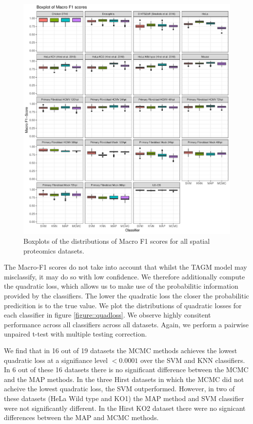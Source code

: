 \documentclass[12pt,english]{article}\usepackage[]{graphicx}\usepackage[]{color}
\makeatletter
\def\maxwidth{ %
  \ifdim\Gin@nat@width>\linewidth
    \linewidth
  \else
    \Gin@nat@width
  \fi
}
\newenvironment{knitrout}{}{} %
\makeatother
\begin{document}
\begin{figure}[p]
  \centering
\begin{knitrout}
\color{fgcolor}
\includegraphics[width=\maxwidth]{figure/f1boxplots-1} 

\end{knitrout}
 \caption{Boxplots of the distributions of Macro F1 scores for all
   spatial proteomics datasets.}
  \label{figure::f1scores}
\end{figure}


The Macro-F1 scores do not take into account that whilst the TAGM
model may misclassify, it may do so with low confidence. We therefore
additionally compute the quadratic loss, which allows us to make use
of the probabilitic information provided by the classifiers. The lower
the quadratic loss the closer the probabilitic predicition is to the
true value. We plot the distributions of quadratic losses for each
classifier in figure \ref{figure::quadloss}. We observe highly
consitent performance across all classifiers across all
datasets. Again, we perform a pairwise unpaired t-test with multiple
testing correction.

We find that in 16 out of 19 datasets {\color{black}{(all of those except HeLa Wild type,
HeLa KO1 and HeLa KO2)}} the MCMC methods achieves the
lowest quadratic loss at a signifiance level $<0.0001$ over the SVM
and KNN classifiers. In 6 out of these 16 datasets there is no
significant difference between the MCMC and the MAP methods. In the
three Hirst datasets in which the MCMC did not acheive the lowest
quadratic loss, the SVM outperformed. However, in two of these
datasets (HeLa Wild type and KO1) the MAP method and SVM classifier were
not significantly different. In the Hirst KO2 dataset there were no
signicant differences between the MAP and MCMC methods.
\end{document}
